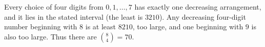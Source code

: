 Every choice of four digits from $0,1,\ldots,7$ has exactly one decreasing arrangement, and it lies in the stated interval (the least is $3210$). Any decreasing four-digit number beginning with $8$ is at least $8210$, too large, and one beginning with $9$ is also too large. Thus there are $\binom84=\boxed{70}$.
